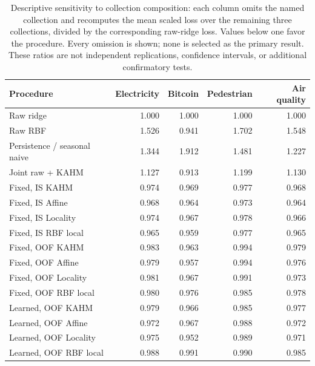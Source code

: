 \begin{table}[!htbp]
\centering\small\setlength{\tabcolsep}{4pt}
\caption{Descriptive sensitivity to collection composition: each column omits the named collection and recomputes the mean scaled loss over the remaining three collections, divided by the corresponding raw-ridge loss. Values below one favor the procedure. Every omission is shown; none is selected as the primary result. These ratios are not independent replications, confidence intervals, or additional confirmatory tests.}
\label{tab:target-leave-one-source-out}
\begin{tabular}{lrrrr}
\toprule
Procedure & Electricity & Bitcoin & Pedestrian & Air quality \\
\midrule
Raw ridge & 1.000 & 1.000 & 1.000 & 1.000 \\
Raw RBF & 1.526 & 0.941 & 1.702 & 1.548 \\
Persistence / seasonal naive & 1.344 & 1.912 & 1.481 & 1.227 \\
Joint raw + KAHM & 1.127 & 0.913 & 1.199 & 1.130 \\
Fixed, IS KAHM & 0.974 & 0.969 & 0.977 & 0.968 \\
Fixed, IS Affine & 0.968 & 0.964 & 0.973 & 0.964 \\
Fixed, IS Locality & 0.974 & 0.967 & 0.978 & 0.966 \\
Fixed, IS RBF local & 0.965 & 0.959 & 0.977 & 0.965 \\
Fixed, OOF KAHM & 0.983 & 0.963 & 0.994 & 0.979 \\
Fixed, OOF Affine & 0.979 & 0.957 & 0.994 & 0.976 \\
Fixed, OOF Locality & 0.981 & 0.967 & 0.991 & 0.973 \\
Fixed, OOF RBF local & 0.980 & 0.976 & 0.985 & 0.978 \\
Learned, OOF KAHM & 0.979 & 0.966 & 0.985 & 0.977 \\
Learned, OOF Affine & 0.972 & 0.967 & 0.988 & 0.972 \\
Learned, OOF Locality & 0.975 & 0.952 & 0.989 & 0.971 \\
Learned, OOF RBF local & 0.988 & 0.991 & 0.990 & 0.985 \\
\bottomrule
\end{tabular}
\end{table}

